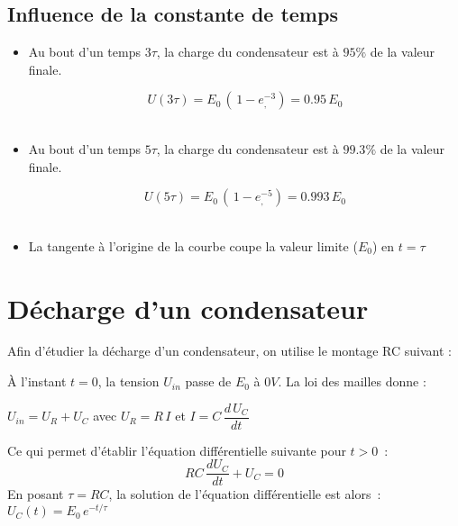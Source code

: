 \subsection*{Influence de la constante de temps}
\smallskip
\begin{itemize}

\item Au bout d'un temps $3\tau$, la charge du condensateur est à $95\%$ de la valeur finale.

$$ U(3\tau) = E_0\,(\,1-e^{-3}_,) = 0.95 \, E_0$$ \\

\item Au bout d'un temps $5\tau$, la charge du condensateur est à $99.3\%$ de la valeur finale.

$$ U(5\tau) = E_0\,(\,1-e^{-5}_,) = 0.993 \, E_0$$ \\


\item La tangente à l'origine de la courbe coupe la valeur limite ($E_0$) en $t = \tau$

\end{itemize}

\pagebreak

\section{Décharge d'un condensateur}

Afin d'étudier la décharge d'un condensateur, on utilise le montage RC suivant :
\begin{center}

\end{center}
À l'instant $t=0$, la tension $U_{in}$ passe de $E_0$ à $0V$. La loi des mailles donne :
\begin{center}
$U_{in} = U_R + U_C$ avec $U_R = R\,I$ et $ I = C \, \dfrac{d\,U_C}{dt} $
\end{center}
Ce qui permet d'établir l'équation différentielle suivante pour $t>0$~:
$$ RC\,\dfrac{dU_C}{dt} + U_C = 0 $$ 
En posant $\tau = RC$, la solution de l'équation différentielle est alors~: $ U_C(t) = E_0\,e^{-t/\tau} $

